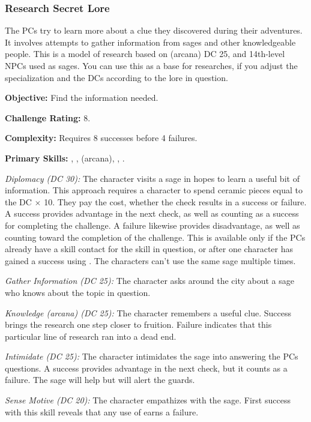 \subsubsection{Research Secret Lore}
The PCs try to learn more about a clue they discovered during their adventures. It involves attempts to gather information from sages and other knowledgeable people. This is a model of research based on  (arcana) DC 25, and 14th-level NPCs used as sages. You can use this as a base for researches, if you adjust the  specialization and the DCs according to the lore in question.

\textbf{Objective:} Find the information needed.

\textbf{Challenge Rating:} 8.

\textbf{Complexity:} Requires 8 successes before 4 failures.

\textbf{Primary Skills:} , ,  (arcana), , .

\textit{Diplomacy (DC 30):} The character visits a sage in hopes to learn a useful bit of information. This approach requires a character to spend ceramic pieces equal to the  DC $\times$ 10. They pay the cost, whether the check results in a success or failure. A success provides advantage in the next  check, as well as counting as a success for completing the challenge. A failure likewise provides disadvantage, as well as counting toward the completion of the challenge. This is available only if the PCs already have a skill contact for the  skill in question, or after one character has gained a success using . The characters can't use the same sage multiple times.

\textit{Gather Information (DC 25):} The character asks around the city about a sage who knows about the topic in question.

\textit{Knowledge (arcana) (DC 25):} The character remembers a useful clue. Success brings the research one step closer to fruition. Failure indicates that this particular line of research ran into a dead end.

\textit{Intimidate (DC 25):} The character intimidates the sage into answering the PCs questions. A success provides advantage in the next  check, but it counts as a failure. The sage will help but will alert the guards.

\textit{Sense Motive (DC 20):} The character empathizes with the sage. First success with this skill reveals that any use of  earns a failure.

